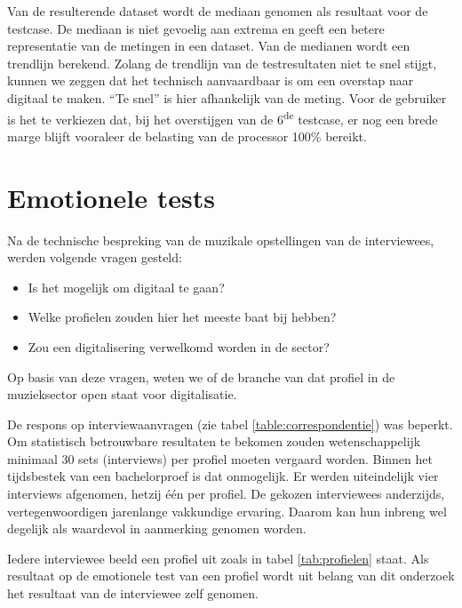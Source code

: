 Van de resulterende dataset wordt de mediaan genomen als resultaat voor de testcase. De mediaan is niet gevoelig aan extrema en geeft een betere representatie van de metingen in een dataset. \autocite{median} Van de medianen wordt een trendlijn berekend. Zolang de trendlijn van de testresultaten niet te snel stijgt, kunnen we zeggen dat het technisch aanvaardbaar is om een overstap naar digitaal te maken. ``Te snel'' is hier afhankelijk van de meting. Voor de gebruiker is het te verkiezen dat, bij het overstijgen van de 6\textsuperscript{de} testcase, er nog een brede marge blijft vooraleer de belasting van de processor 100\% bereikt.

\section{Emotionele tests}
\label{sec:methodologie:emotioneletests}

Na de technische bespreking van de muzikale opstellingen van de interviewees, werden volgende vragen gesteld:

\begin{itemize}
	\item Is het mogelijk om digitaal te gaan?
	\item Welke profielen zouden hier het meeste baat bij hebben?
	\item Zou een digitalisering verwelkomd worden in de sector?
\end{itemize}

Op basis van deze vragen, weten we of de branche van dat profiel in de muzieksector open staat voor digitalisatie.

De respons op interviewaanvragen (zie tabel \ref{table:correspondentie}) was beperkt. Om statistisch betrouwbare resultaten te bekomen zouden wetenschappelijk minimaal 30 sets (interviews) per profiel moeten vergaard worden. Binnen het tijdsbestek van een bachelorproef is dat onmogelijk. Er werden uiteindelijk vier interviews afgenomen, hetzij één per profiel. De gekozen interviewees anderzijds, vertegenwoordigen jarenlange vakkundige ervaring. Daarom kan hun inbreng wel degelijk als waardevol in aanmerking genomen worden. 

Iedere interviewee beeld een profiel uit zoals in tabel \ref{tab:profielen} staat. Als resultaat op de emotionele test van een profiel wordt uit belang van dit onderzoek het resultaat van de interviewee zelf genomen.


